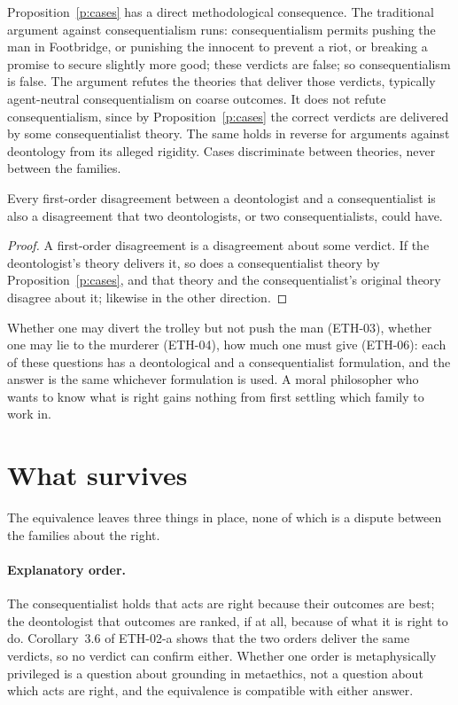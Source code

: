 \documentclass{situationist-preprint}
\begin{document}
Proposition~\ref{p:cases} has a direct methodological consequence. The traditional argument against consequentialism runs: consequentialism permits pushing the man in Footbridge, or punishing the innocent to prevent a riot, or breaking a promise to secure slightly more good; these verdicts are false; so consequentialism is false. The argument refutes the theories that deliver those verdicts, typically agent-neutral consequentialism on coarse outcomes. It does not refute consequentialism, since by Proposition~\ref{p:cases} the correct verdicts are delivered by some consequentialist theory. The same holds in reverse for arguments against deontology from its alleged rigidity. Cases discriminate between theories, never between the families.

\begin{corollary}\label{c:cut}
Every first-order disagreement between a deontologist and a consequentialist is also a disagreement that two deontologists, or two consequentialists, could have.
\end{corollary}

\begin{proof}
A first-order disagreement is a disagreement about some verdict. If the deontologist's theory delivers it, so does a consequentialist theory by Proposition~\ref{p:cases}, and that theory and the consequentialist's original theory disagree about it; likewise in the other direction.
\end{proof}

Whether one may divert the trolley but not push the man (ETH-03), whether one may lie to the murderer (ETH-04), how much one must give (ETH-06): each of these questions has a deontological and a consequentialist formulation, and the answer is the same whichever formulation is used. A moral philosopher who wants to know what is right gains nothing from first settling which family to work in.

\section{What survives}

The equivalence leaves three things in place, none of which is a dispute between the families about the right.

\paragraph{Explanatory order.} The consequentialist holds that acts are right because their outcomes are best; the deontologist that outcomes are ranked, if at all, because of what it is right to do. Corollary~3.6 of ETH-02-a shows that the two orders deliver the same verdicts, so no verdict can confirm either. Whether one order is metaphysically privileged is a question about grounding in metaethics, not a question about which acts are right, and the equivalence is compatible with either answer.
\end{document}
